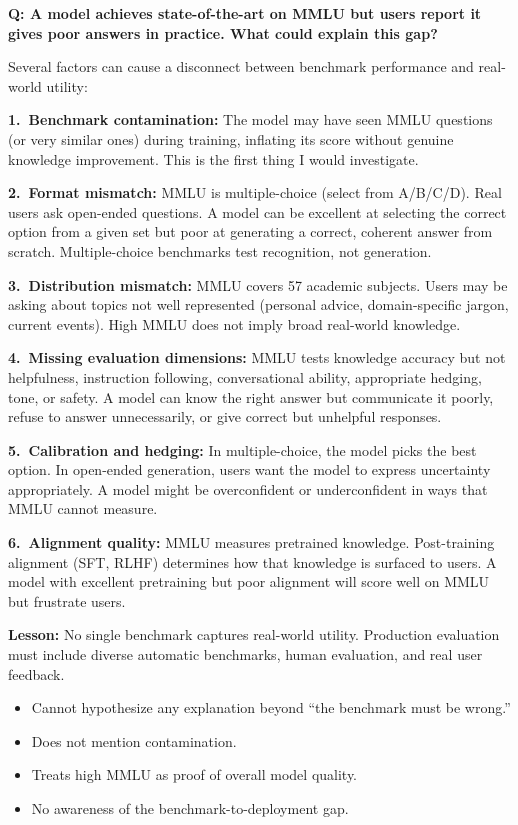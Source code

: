 \begin{interviewq}
\textbf{Q: A model achieves state-of-the-art on MMLU but users report it gives
poor answers in practice. What could explain this gap?}

 \quad {} \quad \badgefreq{\freqmed}

\stronganswer
Several factors can cause a disconnect between benchmark performance and
real-world utility:

\textbf{1.\ Benchmark contamination:}  The model may have seen MMLU questions
(or very similar ones) during training, inflating its score without genuine
knowledge improvement.  This is the first thing I would investigate.

\textbf{2.\ Format mismatch:}  MMLU is multiple-choice (select from A/B/C/D).
Real users ask open-ended questions.  A model can be excellent at selecting
the correct option from a given set but poor at generating a correct, coherent
answer from scratch.  Multiple-choice benchmarks test recognition, not
generation.

\textbf{3.\ Distribution mismatch:}  MMLU covers 57 academic subjects.  Users
may be asking about topics not well represented (personal advice, domain-specific
jargon, current events).  High MMLU does not imply broad real-world knowledge.

\textbf{4.\ Missing evaluation dimensions:}  MMLU tests knowledge accuracy but
not helpfulness, instruction following, conversational ability, appropriate
hedging, tone, or safety.  A model can know the right answer but communicate it
poorly, refuse to answer unnecessarily, or give correct but unhelpful responses.

\textbf{5.\ Calibration and hedging:}  In multiple-choice, the model picks the
best option.  In open-ended generation, users want the model to express
uncertainty appropriately.  A model might be overconfident or underconfident in
ways that MMLU cannot measure.

\textbf{6.\ Alignment quality:}  MMLU measures pretrained knowledge.
Post-training alignment (SFT, RLHF) determines how that knowledge is surfaced
to users.  A model with excellent pretraining but poor alignment will score well
on MMLU but frustrate users.

\textbf{Lesson:}  No single benchmark captures real-world utility.  Production
evaluation must include diverse automatic benchmarks, human evaluation,
and real user feedback.

\redflags
\begin{itemize}
    \item Cannot hypothesize any explanation beyond ``the benchmark must be wrong.''
    \item Does not mention contamination.
    \item Treats high MMLU as proof of overall model quality.
    \item No awareness of the benchmark-to-deployment gap.
\end{itemize}


\end{interviewq}
